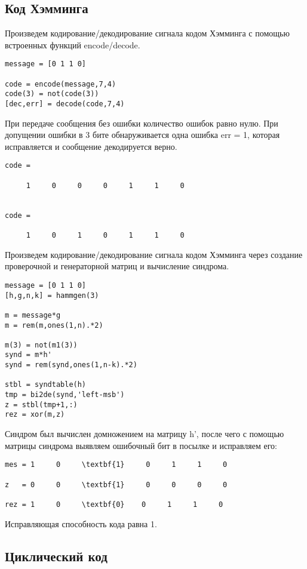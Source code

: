 \documentclass[10pt,a4paper,oneside]{article}
\begin{document}
\subsection{Код Хэмминга}

Произведем кодирование/декодирование сигнала кодом Хэмминга с
помощью встроенных функций encode/decode.

 \begin{verbatim}
message = [0 1 1 0]

code = encode(message,7,4)
code(3) = not(code(3))
[dec,err] = decode(code,7,4)
 \end{verbatim}

При передаче сообщения без ошибки количество ошибок равно нулю.
При допущении ошибки в 3 бите обнаруживается одна ошибка err = 1, которая исправляется и сообщение декодируется верно.
 \begin{verbatim}
code =

     1     0     0     0     1     1     0


code =

     1     0     1     0     1     1     0
 \end{verbatim}
Произведем кодирование/декодирование сигнала кодом Хэмминга через
создание проверочной и генераторной матриц и вычисление
синдрома.

 \begin{verbatim}
message = [0 1 1 0]
[h,g,n,k] = hammgen(3)

m = message*g
m = rem(m,ones(1,n).*2)

m(3) = not(m1(3))
synd = m*h'
synd = rem(synd,ones(1,n-k).*2)

stbl = syndtable(h)
tmp = bi2de(synd,'left-msb')
z = stbl(tmp+1,:)
rez = xor(m,z)
 \end{verbatim}

Синдром был вычислен домножением на матрицу h', после чего с помощью матрицы синдрома выявляем ошибочный бит в посылке и исправляем его:
 \begin{verbatim}
mes = 1     0     \textbf{1}     0     1     1     0

z   = 0     0     \textbf{1}     0     0     0     0

rez = 1     0     \textbf{0}    0     1     1     0
 \end{verbatim}
Исправляющая способность кода равна 1.

\subsection{Циклический код}
\end{document}
